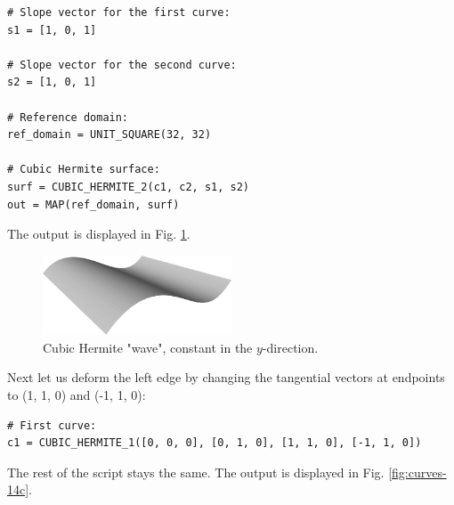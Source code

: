 \begin{bbox}
\begin{verbatim}
# Slope vector for the first curve:
s1 = [1, 0, 1]

# Slope vector for the second curve:
s2 = [1, 0, 1]

# Reference domain:
ref_domain = UNIT_SQUARE(32, 32)

# Cubic Hermite surface:
surf = CUBIC_HERMITE_2(c1, c2, s1, s2)
out = MAP(ref_domain, surf)
\end{verbatim}
\end{bbox}
\vspace{6mm}

\noindent
The output is displayed in Fig. \ref{fig:curves-14b}.

\begin{figure}[!ht]
\begin{center}
\includegraphics[width=0.5\textwidth]{img/curves-14b.png}
\end{center}
\vspace{-6mm}
\caption{Cubic Hermite "wave", constant in the $y$-direction.}
\label{fig:curves-14b}
\end{figure}
\noindent
Next let us deform the left edge by changing the tangential 
vectors at endpoints to (1, 1, 0) and (-1, 1, 0):\\

\begin{bbox}
\begin{verbatim}
# First curve:
c1 = CUBIC_HERMITE_1([0, 0, 0], [0, 1, 0], [1, 1, 0], [-1, 1, 0])
\end{verbatim}
\end{bbox}
\vspace{6mm}

\noindent
The rest of the script stays the same. The output is displayed in Fig. \ref{fig:curves-14c}.
\newpage

